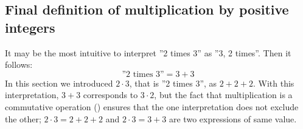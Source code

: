 \subsection*{Final definition of multiplication by positive integers}
It may be the most intuitive to interpret ''2 times 3'' as ''3, 2 times''. Then it follows:
\[ \text{''2 times 3''}=3+3 \]
In this section we introduced $ {2\cdot3} $, that is ''2 times 3'', as $ {2+2+2} $. With this interpretation, $ {3+3} $ corresponds to $ {3\cdot2} $, but the fact that multiplication is a commutative operation () ensures that the one interpretation does not exclude the other; $ {2\cdot3 =2+2+2} $ and $ {2\cdot3=3+3} $ are two expressions of same value.\regv




